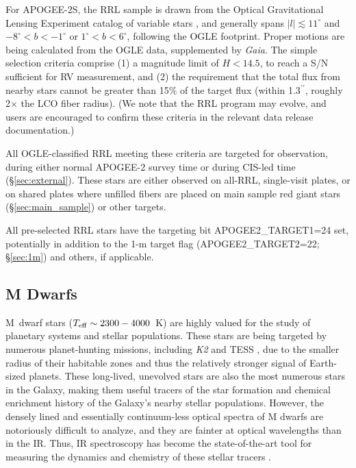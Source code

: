 \documentclass[12pt,twocolumn]{emulateapj}
\begin{document}
For APOGEE-2S, the RRL sample is drawn from the Optical Gravitational Lensing Experiment \citep[OGLE;][]{Udalski_2009_OGLE} catalog of variable stars \citep{Soszynski_2014_OGLERRL}, and generally spans $|l|\lesssim 11^\circ$ and $-8^\circ < b < -1^\circ$ or $1^\circ < b < 6^\circ$, following the OGLE footprint.  Proper motions are being calculated from the OGLE data, supplemented by {\it Gaia}. The simple selection criteria comprise (1) a magnitude limit of $H<14.5$, to reach a S/N sufficient for RV measurement, and (2) the requirement that the total flux from nearby stars cannot be greater than 15\% of the target flux (within 1.3$^{\prime\prime}$, roughly 2$\times$ the LCO fiber radius).  (We note that the RRL program may evolve, and users are encouraged to confirm these criteria in the relevant data release documentation.)  

All OGLE-classified RRL meeting these criteria are targeted for observation, during either normal APOGEE-2 survey time or during CIS-led time (\S\ref{sec:external}).  
These stars are either observed on all-RRL, single-visit plates, or on shared plates where unfilled fibers are placed on main sample red giant stars (\S\ref{sec:main_sample}) or other targets.  

All pre-selected RRL stars have the targeting bit APOGEE2\_TARGET1=24 set, potentially in addition to the 1-m target flag (APOGEE2\_TARGET2=22; \S\ref{sec:1m}) and others, if applicable.


\subsection{M Dwarfs}
\label{sec:m_dwarfs}

M~dwarf stars ($T_{\rm eff} \sim 2300-4000$~K) are highly valued for the study of planetary systems and stellar populations.  These stars are being targeted by numerous planet-hunting missions, including {\it K2} and TESS \citep{Ricker_2014_tess}, due to the smaller radius of their habitable zones and thus the relatively stronger signal of Earth-sized planets.  These long-lived, unevolved stars are also the most numerous stars in the Galaxy, making them useful tracers of the star formation and chemical enrichment history of the Galaxy's nearby stellar populations.  However, the densely lined and essentially continuum-less optical spectra of M dwarfs are notoriously difficult to analyze, and they are fainter at optical wavelengths than in the IR.  Thus, IR spectroscopy has become the state-of-the-art tool for measuring the dynamics and chemistry of these stellar tracers \citep[e.g.,][]{Onehag_2012_mdwarfsIR,Schmidt_2016_apogeeKMdwarfs,Souto_2017_apogeeMdwarfplanets}.
\end{document}

